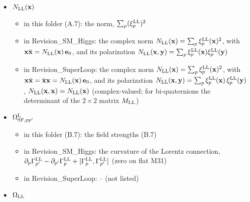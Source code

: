 \documentclass[
  10pt,
]{article}
\providecommand{\tightlist}{%
  \setlength{\itemsep}{0pt}\setlength{\parskip}{0pt}}
\begin{document}
\begin{itemize}
  \begin{itemize}
  \tightlist
  \item
    in this folder (B.7): a uniform scalar density and a shift of the
    Dirac mass
  \item
    in Revision\_SM\_Higgs: the number density
    \(\langle\Psi^\dagger_{\rm LL}\Psi_{\rm LL}\rangle\) and the scalar
    density \(\langle\bar\Psi_{\rm LL}\Psi_{\rm LL}\rangle\) of a
    uniform state, each measured from its value in the normal vacuum
  \item
    in Revision\_SuperLoop: -- (not listed)
  \end{itemize}
\item
  \(N_{\rm LL}(\mathbf x)\)

  \begin{itemize}
  \tightlist
  \item
    in this folder (A.7): the norm, \(\sum_p(\xi^{\rm LL}_p)^2\)
  \item
    in Revision\_SM\_Higgs: the complex norm
    \(N_{\rm LL}(\mathbf x)=\sum_p\xi^{\rm LL}_p(\mathbf x)^2\), with
    \(\mathbf x\bar{\mathbf x}=N_{\rm LL}(\mathbf x)\,\mathbf e_0\), and
    its polarization
    \(N_{\rm LL}(\mathbf x,\mathbf y)=\sum_p\xi^{\rm LL}_p(\mathbf x)\xi^{\rm LL}_p(\mathbf y)\)
  \item
    in Revision\_SuperLoop: the complex norm
    \(N_{\rm LL}(\mathbf x)=\sum_p\xi^{\rm LL}_p(\mathbf x)^2\), with
    \(\mathbf x\bar{\mathbf x}=\bar{\mathbf x}\mathbf x=N_{\rm LL}(\mathbf x)\,\mathbf e_0\),
    and its polarization
    \(N_{\rm LL}(\mathbf x,\mathbf y)=\sum_p\xi^{\rm LL}_p(\mathbf x)\,\xi^{\rm LL}_p(\mathbf y)\),
    \(N_{\rm LL}(\mathbf x,\mathbf x)=N_{\rm LL}(\mathbf x)\)
    (complex-valued; for bi-quaternions the determinant of the
    \(2\times2\) matrix \(M_{\rm LL}\))
  \end{itemize}
\item
  \(\Omega^{\rm L}_{{\rm SF},pp'}\)

  \begin{itemize}
  \tightlist
  \item
    in this folder (B.7): the field strengths (B.7)
  \item
    in Revision\_SM\_Higgs: the curvature of the Lorentz connection,
    \(\partial_p\Gamma^{\rm LL}_{p'}-\partial_{p'}\Gamma^{\rm LL}_p+[\Gamma^{\rm LL}_p,\Gamma^{\rm LL}_{p'}]\)
    (zero on flat M31)
  \item
    in Revision\_SuperLoop: -- (not listed)
  \end{itemize}
\item
  \(\Omega_{\rm LL}\)


\end{itemize}
\end{document}
